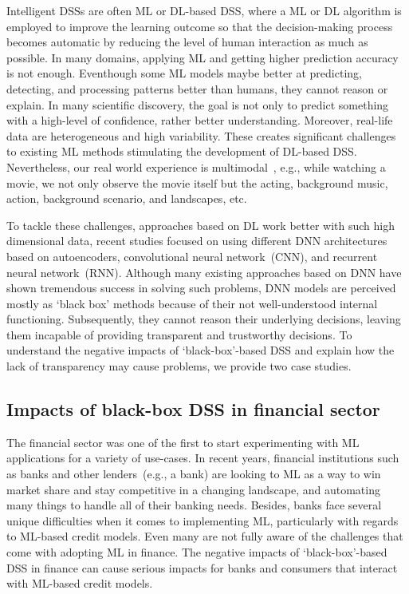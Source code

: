 \hspace*{3.5mm} Intelligent DSSs are often ML or DL-based DSS, where a ML or DL algorithm is employed to improve the learning outcome so that the decision-making process becomes automatic by reducing the level of human interaction as much as possible. In many domains, applying ML and getting higher prediction accuracy is not enough. Eventhough some ML models maybe better at predicting, detecting, and processing patterns better than humans, they cannot reason or explain. In many scientific discovery, the goal is not only to predict something with a high-level of confidence, rather better understanding. Moreover, real-life data are heterogeneous and high variability. These creates significant challenges to existing ML methods stimulating the development of DL-based DSS. Nevertheless, our real world experience is multimodal~\cite{mmsurvey}, e.g., while watching a movie, we not only observe the movie itself but the acting, background music, action, background scenario, and landscapes, etc. 

\hspace*{3.5mm} To tackle these challenges, approaches based on DL work better with such high dimensional data, recent studies focused on using different DNN architectures based on autoencoders, convolutional neural network~(CNN), and recurrent neural network~(RNN). Although many existing approaches based on DNN have shown tremendous success in solving such problems, DNN models are perceived mostly as `black box' methods because of their not well-understood internal functioning. Subsequently, they cannot reason their underlying decisions, leaving them incapable of providing transparent and trustworthy decisions. 
To understand the negative impacts of `black-box'-based DSS and explain how the lack of transparency may cause problems, we provide two case studies. 

\subsection{Impacts of black-box DSS in financial sector}
The financial sector was one of the first to start experimenting with ML applications for a variety of use-cases. In recent years, financial institutions such as banks and other lenders~(e.g., a bank) are looking to ML as a way to win market share and stay competitive in a changing landscape, and automating many things to handle all of their banking needs. Besides, banks face several unique difficulties when it comes to implementing ML, particularly with regards to ML-based credit models. Even many are not fully aware of the challenges that come with adopting ML in finance. The negative impacts of `black-box'-based DSS in finance can cause serious impacts for banks and consumers that interact with ML-based credit models.

